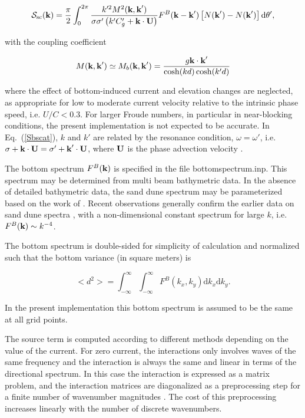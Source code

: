 \begin{equation}
{\cal S}_{\mathrm{sc}}({\mbox{\bf k}}) =
\frac{\pi}{2}\int_{0}^{2 \pi}
 \frac{k'^2 M^2({\mbox{\bf k}},\textbf{k}')}{\sigma \sigma' \left(k' C'_g +
{\mbox{\bf k}}  \cdot {\bf U}  \right)}
 F^B({\mbox{\bf k}}-\textbf{k}')
\left[N(\textbf{k}')- N(\textbf{k}')\right] {\mathrm d}
\theta',\label{Sbscat}
\end{equation}

\noindent
with the coupling coefficient

\begin{equation}
M({\mbox{\bf k}},{\mbox{\bf k}}^\prime)\simeq M_b({\mbox{\bf k}},{\mbox{\bf k}}^\prime) =\frac{g {\mbox{\bf k}}
\cdot {\mbox{\bf k}}^\prime}{\cosh(kd)\cosh(k'd)}
\end{equation}

\noindent
 where the effect of bottom-induced current and elevation changes are
neglected, as appropriate for low to moderate current velocity relative to the
intrinsic phase speed, i.e. $U/C < 0.3$. For larger Froude numbers, in
particular in near-blocking conditions, the present implementation is not
expected to be accurate.  In Eq.~(\ref{Sbscat}), $k$ and $k'$ are related by
the resonance condition, $\omega=\omega'$, i.e. $\sigma+{\mbox{\bf k}} \cdot {\bf U}
=\sigma' + {\mbox{\bf k}}^\prime \cdot {\bf U}$, where ${\bf U}$ is the phase advection
velocity \cite[see, e.g.,][]{art:WISE07}.

The bottom spectrum $F^B({\mbox{\bf k}})$ is specified in the file {\file
bottomspectrum.inp}. This spectrum may be determined from multi beam
bathymetric data.  In the absence of detailed bathymetric data, the sand dune
spectrum may be parameterized based on the work of \cite{art:Hino68}.  Recent
observations generally confirm the earlier data on sand dune spectra
\citep{art:AM07}, with a non-dimensional constant spectrum for large $k$,
i.e. $F^B({\mbox{\bf k}}) \sim k^{-4}$.

The bottom spectrum is double-sided for simplicity of calculation
and normalized such that the bottom variance (in square meters) is

\begin{equation}
<d^2> =\int_{-\infty}^{\infty} \int_{-\infty}^{\infty}
F^B(k_x,k_y)  {\mathrm d} k_x  {\mathrm d} k_y.
\end{equation}

\noindent
In the present implementation this bottom spectrum is assumed to be the same
at all grid points.

The source term is computed according to different methods depending on the
value of the current. For zero current, the interactions only involves waves
of the same frequency and the interaction is always the same and linear in
terms of the directional spectrum. In this case the interaction is expressed
as a matrix problem, and the interaction matrices are diagonalized as a
preprocessing step for a finite number of wavenumber magnitudes
\citep{art:AH02}.  The cost of this preprocessing increases linearly with the
number of discrete wavenumbers.


